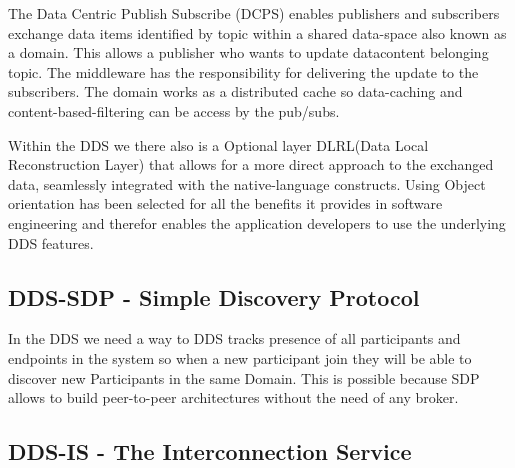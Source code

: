 The Data Centric Publish Subscribe (DCPS) enables publishers and subscribers exchange
data items identified by topic within a shared data-space also known as a domain. This allows a publisher who wants to update datacontent belonging topic. The middleware has the responsibility for delivering the update to the subscribers. The domain works as a distributed cache so data-caching and content-based-filtering can be access by the pub/subs.

Within the DDS we there also is a Optional layer DLRL(Data Local Reconstruction Layer) that allows for a more direct approach to the exchanged data, seamlessly integrated with the native-language
constructs. Using Object orientation has been selected for all the benefits it provides in software engineering and therefor enables the application developers to use the underlying DDS features.

\subsection{DDS-SDP - Simple Discovery Protocol}
In the DDS we need a way to DDS tracks presence of all participants and endpoints in the system so when a new participant join they will be able to discover new Participants in the same Domain. This is possible because SDP allows to build peer-to-peer architectures without the need of any broker. 

\subsection{DDS-IS - The Interconnection Service}
